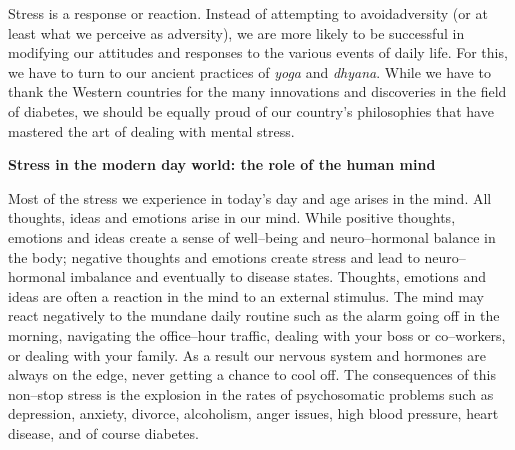 Stress is a response or reaction. Instead of attempting to avoid\break adversity (or at least what we perceive as adversity), we are more likely to be successful in modifying our attitudes and responses to the various events of daily life. For this, we have to turn to our ancient practices of \textit{yoga} and \textit{dhyana}. While we have to thank the Western countries for the many innovations and discoveries in the field of diabetes, we should be equally proud of our country’s philosophies that have mastered the art of dealing with mental stress.

\noindent\textbf{Stress in the modern day world: the role of the human mind}

Most of the stress we experience in today’s day and age arises in the mind. All thoughts, ideas and emotions arise in our mind. While positive thoughts, emotions and ideas create a sense of well–being and neuro–hormonal balance in the body; negative thoughts and emotions create stress and lead to neuro–hormonal imbalance and eventually to disease states. Thoughts, emotions and ideas are often a reaction in the mind to an external stimulus. The mind may react negatively to the mundane daily routine such as the alarm going off in the morning, navigating the office–hour traffic, dealing with your boss or co–workers, or dealing with your family. As a result our nervous system and hormones are always on the edge, never getting a chance to cool off. The consequences of this non–stop stress is the explosion in the rates of psychosomatic problems such as depression, anxiety, divorce, alcoholism, anger issues, high blood pressure, heart disease, and of course diabetes.


